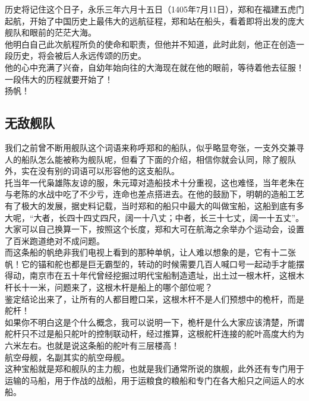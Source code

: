 \begin{multicols}{\theparacolNo}
历史将记住这个日子，永乐三年六月十五日（1405年7月11日），郑和在福建五虎门起航，开始了中国历史上最伟大的远航征程，郑和站在船头，看着即将出发的庞大舰队和眼前的茫茫大海。\\

他明白自己此次航程所负的使命和职责，但他并不知道，此时此刻，他正在创造一段历史，将会被后人永远传颂的历史。\\

他的心中充满了兴奋，自幼年始向往的大海现在就在他的眼前，等待着他去征服！一段伟大的历程就要开始了！\\

扬帆！\\

\subsection{无敌舰队}
我们之前曾不断用舰队这个词语来称呼郑和的船队，似乎略显夸张，一支外交兼寻人的船队怎么能被称为舰队呢，但看了下面的介绍，相信你就会认同，除了舰队外，实在没有别的词语可以形容他的这支船队。\\

托当年一代枭雄陈友谅的服，朱元璋对造船技术十分重视，这也难怪，当年老朱在与老陈的水战中吃了不少亏，连命也差点搭进去。在他的鼓励下，明朝的造船工艺有了极大的发展，据史料记载，当时郑和的船只中最大的叫做宝船，这船到底有多大呢，“大者，长四十四丈四尺，阔一十八丈；中者，长三十七丈，阔一十五丈”。大家可以自己换算一下，按照这个长度，郑和大可在航海之余举办个运动会，设置了百米跑道绝对不成问题。\\

而这条船的帆绝非我们电视上看到的那种单帆，让人难以想象的是，它有十二张帆！它的锚和舵也都是巨无霸型的，转动的时候需要几百人喊口号一起动手才能摆得动，南京市在五十年代曾经挖掘过明代宝船制造遗址，出土过一根木杆，这根木杆长十一米，问题来了，这根木杆是船上的哪个部位呢？\\

鉴定结论出来了，让所有的人都目瞪口呆，这根木杆不是人们预想中的桅杆，而是舵杆！\\

如果你不明白这是个什么概念，我可以说明一下，桅杆是什么大家应该清楚，所谓舵杆只不过是船只舵叶的控制联动杆，经过推算，这根舵杆连接的舵叶高度大约为六米左右。也就是说这条船的舵叶有三层楼高！\\

航空母舰，名副其实的航空母舰。\\

这种宝船就是郑和舰队的主力舰，也就是我们通常所说的旗舰，此外还有专门用于运输的马船，用于作战的战船，用于运粮食的粮船和专门在各大船只之间运人的水船。\\


\end{multicols}
